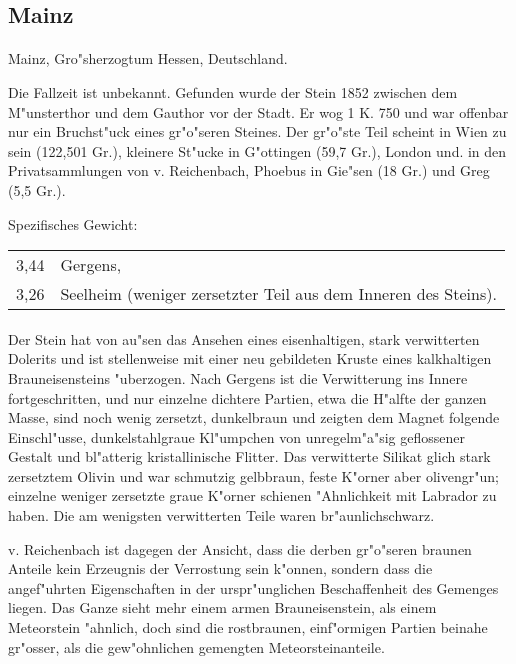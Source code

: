 \documentclass[a4paper, 11pt, oneside]{article}
\begin{document}
\subsection{Mainz}
\normalsize
\paragraph{}
Mainz, Gro"sherzogtum Hessen, Deutschland.

Die Fallzeit ist unbekannt. Gefunden wurde der Stein 1852 zwischen dem M"unsterthor und dem Gauthor vor der Stadt. Er wog 1 K. 750 und war offenbar nur ein Bruchst"uck eines gr"o"seren Steines. Der gr"o"ste Teil scheint in Wien zu sein (122,501 Gr.), kleinere St"ucke in G"ottingen (59,7 Gr.), London und. in den Privatsammlungen von v. Reichenbach, Phoebus in Gie"sen (18 Gr.) und Greg (5,5 Gr.).

Spezifisches Gewicht:  
\begin{table}[!ht]
    \centering
    \begin{tabular}{l l}
        3,44 & Gergens,\\
        3,26 & Seelheim (weniger zersetzter Teil aus dem Inneren des Steins).
    \end{tabular}
\end{table}
\paragraph{}
Der Stein hat von au"sen das Ansehen eines eisenhaltigen, stark verwitterten Dolerits und ist stellenweise mit einer neu gebildeten Kruste eines kalkhaltigen Brauneisensteins "uberzogen. Nach Gergens ist die Verwitterung ins Innere fortgeschritten, und nur einzelne dichtere Partien, etwa die H"alfte der ganzen Masse, sind noch wenig zersetzt, dunkelbraun und zeigten dem Magnet folgende Einschl"usse, dunkelstahlgraue Kl"umpchen von unregelm"a"sig geflossener Gestalt und bl"atterig kristallinische Flitter. Das verwitterte Silikat glich stark zersetztem Olivin und war schmutzig gelbbraun, feste K"orner aber olivengr"un; einzelne weniger zersetzte graue K"orner schienen "Ahnlichkeit mit Labrador zu haben. Die am wenigsten verwitterten Teile waren br"aunlichschwarz.

v. Reichenbach ist dagegen der Ansicht, dass die derben gr"o"seren braunen Anteile kein Erzeugnis der Verrostung sein k"onnen, sondern dass die angef"uhrten Eigenschaften in der urspr"unglichen Beschaffenheit des Gemenges liegen. Das Ganze sieht mehr einem armen Brauneisenstein, als einem Meteorstein "ahnlich, doch sind die rostbraunen, einf"ormigen Partien beinahe gr"osser, als die gew"ohnlichen gemengten Meteorsteinanteile.
\end{document}

